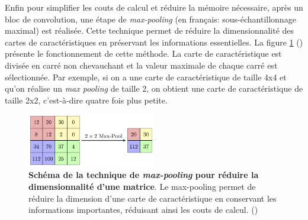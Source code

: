 Enfin pour simplifier les couts de calcul et réduire la mémoire nécessaire, après un bloc de convolution, une étape de \textit{max-pooling }(en français: sous-échantillonnage maximal) est réalisée. Cette technique permet de réduire la dimensionnalité des cartes de caractéristiques en préservant les informations essentielles. La figure \ref{fig:max-pool} (\cite{aurelien_geron_hands-machine_2019}) présente le fonctionnement de cette méthode. La carte de caractéristique est divisée en carré non chevauchant et la valeur maximale de chaque carré est sélectionnée. Par exemple, si on a une carte de caractéristique de taille 4x4 et qu'on réalise un \textit{max pooling} de taille 2, on obtient une carte de caractéristique de taille 2x2, c'est-à-dire quatre fois plus petite.
\begin{figure}[!ht]
 \centering
 \includegraphics[width=0.5\textwidth]{figures/max-pool.png}
 \caption[Technique de max-pooling]{\textbf{Schéma de la technique de \textit{max-pooling} pour réduire la dimensionnalité d'une matrice}. Le max-pooling permet de réduire la dimension d'une carte de caractéristique en conservant les informations importantes, réduisant ainsi les couts de calcul. (\cite{aurelien_geron_hands-machine_2019})}
 \label{fig:max-pool}
\end{figure}


